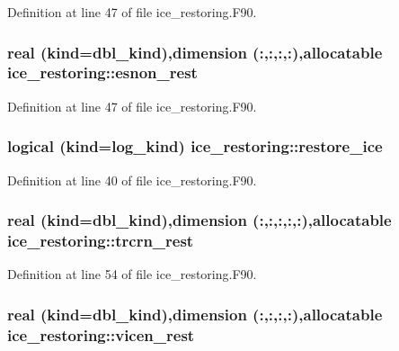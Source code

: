 Definition at line 47 of file ice\_\-restoring.F90.\hypertarget{namespaceice__restoring_a58f323dca24452c0602f2010b2bdec76}{
\subsubsection[{esnon\_\-rest}]{\setlength{\rightskip}{0pt plus 5cm}real (kind=dbl\_\-kind),dimension (:,:,:,:),allocatable {\bf ice\_\-restoring::esnon\_\-rest}}}
\label{namespaceice__restoring_a58f323dca24452c0602f2010b2bdec76}


Definition at line 47 of file ice\_\-restoring.F90.\hypertarget{namespaceice__restoring_a4c1ab4e7a35fa0a753fd36909805bfc9}{
\subsubsection[{restore\_\-ice}]{\setlength{\rightskip}{0pt plus 5cm}logical (kind=log\_\-kind) {\bf ice\_\-restoring::restore\_\-ice}}}
\label{namespaceice__restoring_a4c1ab4e7a35fa0a753fd36909805bfc9}


Definition at line 40 of file ice\_\-restoring.F90.\hypertarget{namespaceice__restoring_a4d5ba93af3c3dfb0760f609dc7ed6692}{
\subsubsection[{trcrn\_\-rest}]{\setlength{\rightskip}{0pt plus 5cm}real (kind=dbl\_\-kind),dimension (:,:,:,:,:),allocatable {\bf ice\_\-restoring::trcrn\_\-rest}}}
\label{namespaceice__restoring_a4d5ba93af3c3dfb0760f609dc7ed6692}


Definition at line 54 of file ice\_\-restoring.F90.\hypertarget{namespaceice__restoring_a4ebbb2fde1fd6d9cd8b5e5b9d3d87282}{
\subsubsection[{vicen\_\-rest}]{\setlength{\rightskip}{0pt plus 5cm}real (kind=dbl\_\-kind),dimension (:,:,:,:),allocatable {\bf ice\_\-restoring::vicen\_\-rest}}}
\label{namespaceice__restoring_a4ebbb2fde1fd6d9cd8b5e5b9d3d87282}


